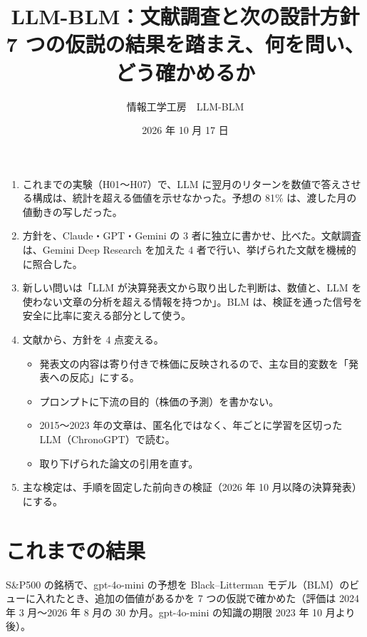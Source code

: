 \documentclass[xelatex,ja=standard,jafont=haranoaji,a4paper,10pt]{bxjsarticle}
\title{LLM-BLM：文献調査と次の設計方針\\[4pt]\large 7 つの仮説の結果を踏まえ、何を問い、どう確かめるか}
\author{情報工学工房　LLM-BLM}
\date{2026 年 10 月 17 日}
\begin{document}
\maketitle

\begin{keybox}[この文書の要点]
\begin{enumerate}
\item これまでの実験（H01〜H07）で、LLM に翌月のリターンを数値で答えさせる構成は、統計を超える価値を示せなかった。予想の 81\% は、渡した月の値動きの写しだった。
\item 方針を、Claude・GPT・Gemini の 3 者に独立に書かせ、比べた。文献調査は、Gemini Deep Research を加えた 4 者で行い、挙げられた文献を機械的に照合した。
\item 新しい問いは「LLM が決算発表文から取り出した判断は、数値と、LLM を使わない文章の分析を超える情報を持つか」。BLM は、検証を通った信号を安全に比率に変える部分として使う。
\item 文献から、方針を 4 点変える。
  \begin{itemize}
  \item 発表文の内容は寄り付きで株価に反映されるので、主な目的変数を「発表への反応」にする。
  \item プロンプトに下流の目的（株価の予測）を書かない。
  \item 2015〜2023 年の文章は、匿名化ではなく、年ごとに学習を区切った LLM（ChronoGPT）で読む。
  \item 取り下げられた論文の引用を直す。
  \end{itemize}
\item 主な検定は、手順を固定した前向きの検証（2026 年 10 月以降の決算発表）にする。
\end{enumerate}
\end{keybox}

\tableofcontents

\section{これまでの結果}

S\&P500 の銘柄で、gpt-4o-mini の予想を Black--Litterman モデル（BLM）のビューに入れたとき、追加の価値があるかを 7 つの仮説で確かめた（評価は 2024 年 3 月〜2026 年 8 月の 30 か月。gpt-4o-mini の知識の期限 2023 年 10 月より後）。
\end{document}
